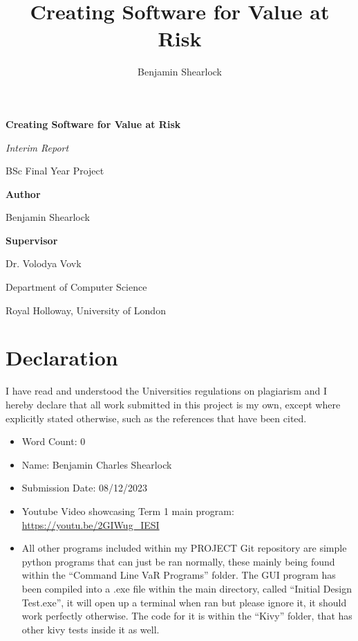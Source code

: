 \documentclass{article}
\title{Creating Software for Value at Risk}
\author{Benjamin Shearlock}
\begin{document}
\raggedright

\begin{titlepage}
  \begin{center}
    \vspace*{1cm}
    {\LARGE \textbf{Creating Software for Value at Risk} \par} 
    \vspace{1.5cm}
    {\Large \textit{Interim Report} \par}
    \vspace{0.5cm}
    {\Large BSc Final Year Project \par}
    \vspace{2cm}
    {\large \textbf{Author} \par}
    {\large Benjamin Shearlock \par}
    \vspace{2cm}
    {\large \textbf{Supervisor} \par}
    {\large Dr. Volodya Vovk \par}
    \vfill
    {\large Department of Computer Science \par}
    {\large Royal Holloway, University of London \par}
  \end{center}
\end{titlepage}

\setlength{\parindent}{0pt}

\section*{Declaration}
I have read and understood the Universities regulations on plagiarism and I hereby declare that all work submitted in this project is my own, except where explicitly stated otherwise, such as the references that have been cited. \\

\begin{itemize}
  \item Word Count: 0
  \item Name: Benjamin Charles Shearlock
  \item Submission Date: 08/12/2023
  \item Youtube Video showcasing Term 1 main program: \url{https://youtu.be/2GIWug_IESI}
  \item All other programs included within my PROJECT Git repository are simple python programs that can just be ran normally, these mainly being found within the ``Command Line VaR Programs'' folder. The GUI program has been compiled into a .exe file within the main directory, called “Initial Design Test.exe”, it will open up a terminal when ran but please ignore it, it should work perfectly otherwise. The code for it is within the ``Kivy'' folder, that has other kivy tests inside it as well.

\end{itemize}
\end{document}
